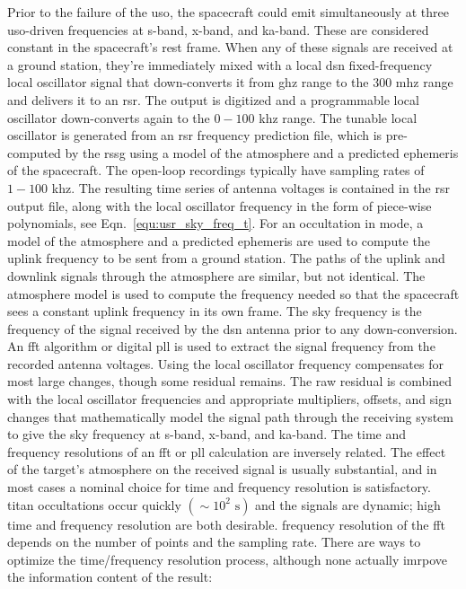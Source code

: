 \documentclass[oneside]{book}
\theoremstyle{mystyle}
\begin{document}
Prior to the failure of the \gls{uso}, the spacecraft could emit simultaneously at three \gls{uso}-driven frequencies at \gls{s-band}, \gls{x-band}, and \gls{ka-band}. These are considered constant in the spacecraft's rest frame. When any of these signals are received at a ground station, they're immediately mixed with a local \gls{dsn} fixed-frequency local oscillator signal that down-converts it from \gls{ghz} range to the $300$ \gls{mhz} range and delivers it to an \gls{rsr}. The output is digitized and a programmable local oscillator down-converts again to the $0-100$ \gls{khz} range. The tunable local oscillator is generated from an \gls{rsr} \gls{frequency} prediction file, which is pre-computed by the \gls{rssg} using a model of the \gls{atmosphere} and a predicted \gls{ephemeris} of the spacecraft. The \gls{open-loop} recordings typically have sampling rates of $1-100$ \gls{khz}. The resulting time series of antenna voltages is contained in the \gls{rsr} output file, along with the local oscillator frequency in the form of piece-wise polynomials, see Eqn.~\ref{equ:usr_sky_freq_t}. For an \gls{occultation} in  mode, a model of the \gls{atmosphere} and a predicted \gls{ephemeris} are used to compute the \gls{uplink} \gls{frequency} to be sent from a ground station. The paths of the \gls{uplink} and \gls{downlink} signals through the \gls{atmosphere} are similar, but not identical. The \gls{atmosphere} model is used to compute the \gls{frequency} needed so that the spacecraft sees a constant \gls{uplink} \gls{frequency} in its own frame. The \gls{sky frequency} is the frequency of the signal received by the \gls{dsn} antenna prior to any down-conversion. An \gls{fft} algorithm or digital \gls{pll} is used to extract the signal frequency from the recorded antenna voltages. Using the local oscillator \gls{frequency} compensates for most large changes, though some residual remains. The raw residual is combined with the local oscillator frequencies and appropriate multipliers, offsets, and sign changes that mathematically model the signal path through the receiving system to give the \gls{sky frequency} at \gls{s-band}, \gls{x-band}, and \gls{ka-band}. The time and frequency resolutions of an \gls{fft} or \gls{pll} calculation are inversely related. The effect of the target's atmosphere on the received signal is usually substantial, and in most cases a nominal choice for time and frequency resolution is satisfactory. \gls{titan} \glspl{occultation} occur quickly $(\sim 10^{2}\textrm{ s})$ and the signals are dynamic; high time and \gls{frequency} \gls{resolution} are both desirable. \Gls{frequency} \gls{resolution} of the \gls{fft} depends on the number of points and the \gls{sampling rate}. There are ways to optimize the time/frequency resolution process, although none actually imrpove the information content of the result:
\end{document}
